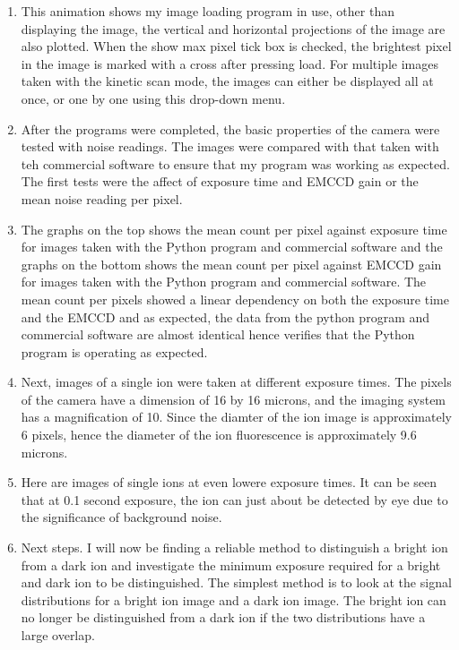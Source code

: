 \documentclass[12pt]{article}
\begin{document}
\begin{enumerate}
\item This animation shows my image loading program in use, other than displaying the image, the vertical and horizontal projections of the image are also plotted. When the show max pixel tick box is checked, the brightest pixel in the image is marked with a cross after pressing load. For multiple images taken with the kinetic scan mode, the images can either be displayed all at once, or one by one using this drop-down menu.

\item After the programs were completed, the basic properties of the camera were tested with noise readings. The images were compared with that taken with teh commercial software to ensure that my program was working as expected. The first tests were the affect of exposure time and EMCCD gain or the mean noise reading per pixel.

\item The graphs on the top shows the mean count per pixel against exposure time for images taken with the Python program and commercial software and the graphs on the bottom shows the mean count per pixel against EMCCD gain for images taken with the Python program and commercial software. The mean count per pixels showed a linear dependency on both the exposure time and the EMCCD and as expected, the data from the python program and commercial software are almost identical hence verifies that the Python program is operating as expected.

\item Next, images of a single ion were taken at different exposure times. The pixels of the camera have a dimension of 16 by 16 microns, and the imaging system has a magnification of 10. Since the diamter of the ion image is approximately 6 pixels, hence the diameter of the ion fluorescence is approximately 9.6 microns.

\item Here are images of single ions at even lowere exposure times. It can be seen that at 0.1 second exposure, the ion can just about be detected by eye due to the significance of background noise.

\item Next steps. I will now be finding a reliable method to distinguish a bright ion from a dark ion and investigate the minimum exposure required for a bright and dark ion to be distinguished. The simplest method is to look at the signal distributions for a bright ion image and a dark ion image. The bright ion can no longer be distinguished from a dark ion if the two distributions have a large overlap.


\end{enumerate}
\end{document}
